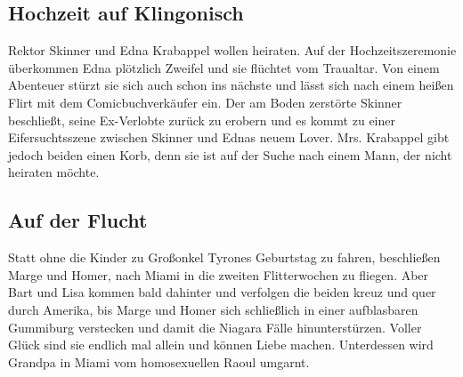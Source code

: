 
\subsection{Hochzeit auf Klingonisch}\label{FABF12}
Rektor Skinner und Edna Krabappel wollen heiraten. Auf der Hochzeitszeremonie überkommen Edna plötzlich Zweifel und sie flüchtet vom Traualtar. Von einem Abenteuer stürzt sie sich auch schon ins nächste und lässt sich nach einem heißen Flirt mit dem Comicbuchverkäufer ein. Der am Boden zerstörte Skinner beschließt, seine Ex-Verlobte zurück zu erobern und es kommt zu einer Eifersuchtsszene zwischen Skinner und Ednas neuem Lover. Mrs. Krabappel gibt jedoch beiden einen Korb, denn sie ist auf der Suche nach einem Mann, der nicht heiraten möchte.


\subsection{Auf der Flucht}\label{FABF14}
Statt ohne die Kinder zu Großonkel Tyrones Geburtstag zu fahren, beschließen Marge und Homer, nach Miami in die zweiten Flitterwochen zu fliegen. Aber Bart und Lisa kommen bald dahinter und verfolgen die beiden kreuz und quer durch Amerika, bis Marge und Homer sich schließlich in einer aufblasbaren Gummiburg verstecken und damit die Niagara Fälle hinunterstürzen. Voller Glück sind sie endlich mal allein und können Liebe machen. Unterdessen wird Grandpa in Miami vom homosexuellen Raoul umgarnt.

